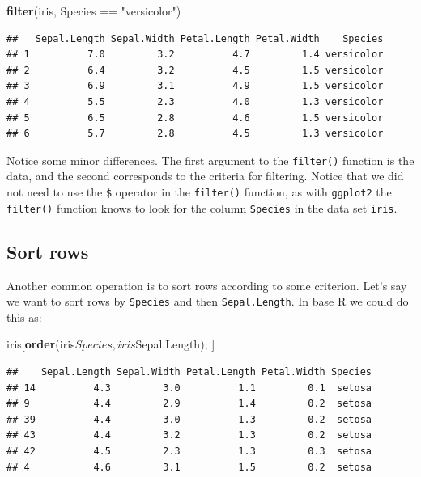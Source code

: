 \documentclass[]{book}
\newenvironment{Shaded}{\begin{snugshade}}{\end{snugshade}}
\newcommand{\KeywordTok}[1]{\textcolor[rgb]{0.13,0.29,0.53}{\textbf{{#1}}}}
\newcommand{\StringTok}[1]{\textcolor[rgb]{0.31,0.60,0.02}{{#1}}}
\newcommand{\NormalTok}[1]{{#1}}
\theoremstyle{definition}
\theoremstyle{definition}
\theoremstyle{definition}
\theoremstyle{remark}
\begin{document}
\begin{Shaded}
\begin{Highlighting}[]
\KeywordTok{filter}\NormalTok{(iris, Species ==}\StringTok{ "versicolor"}\NormalTok{)}
\end{Highlighting}
\end{Shaded}

\begin{verbatim}
##   Sepal.Length Sepal.Width Petal.Length Petal.Width    Species
## 1          7.0         3.2          4.7         1.4 versicolor
## 2          6.4         3.2          4.5         1.5 versicolor
## 3          6.9         3.1          4.9         1.5 versicolor
## 4          5.5         2.3          4.0         1.3 versicolor
## 5          6.5         2.8          4.6         1.5 versicolor
## 6          5.7         2.8          4.5         1.3 versicolor
\end{verbatim}

Notice some minor differences. The first argument to the
\texttt{filter()} function is the data, and the second corresponds to
the criteria for filtering. Notice that we did not need to use the
\texttt{\$} operator in the \texttt{filter()} function, as with
\texttt{ggplot2} the \texttt{filter()} function knows to look for the
column \texttt{Species} in the data set \texttt{iris}.

\subsection{Sort rows}\label{sort-rows}

Another common operation is to sort rows according to some criterion.
Let's say we want to sort rows by \texttt{Species} and then
\texttt{Sepal.Length}. In base R we could do this as:

\begin{Shaded}
\begin{Highlighting}[]
\NormalTok{iris[}\KeywordTok{order}\NormalTok{(iris$Species, iris$Sepal.Length), ]}
\end{Highlighting}
\end{Shaded}

\begin{verbatim}
##    Sepal.Length Sepal.Width Petal.Length Petal.Width Species
## 14          4.3         3.0          1.1         0.1  setosa
## 9           4.4         2.9          1.4         0.2  setosa
## 39          4.4         3.0          1.3         0.2  setosa
## 43          4.4         3.2          1.3         0.2  setosa
## 42          4.5         2.3          1.3         0.3  setosa
## 4           4.6         3.1          1.5         0.2  setosa
\end{verbatim}
\end{document}

